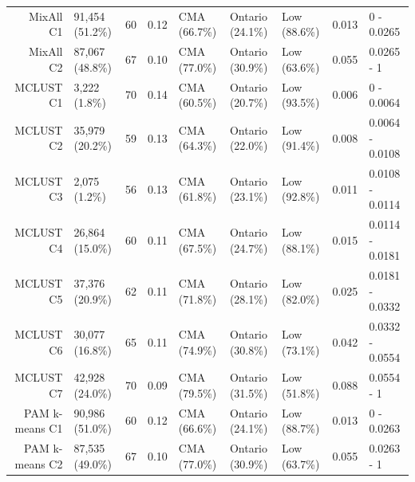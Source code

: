 \documentclass[11pt, a4paper]{article}
\begin{document}
\begin{table}[H]
{\begin{tabular}{|r|llllllll|}
  MixAll C1 & 91,454 (51.2\%) & 60 & 0.12 & CMA (66.7\%) & Ontario (24.1\%) & Low (88.6\%) & 0.013 & 0 - 0.0265 \\ 
  MixAll C2 & 87,067 (48.8\%) & 67 & 0.10 & CMA (77.0\%) & Ontario (30.9\%) & Low (63.6\%) & 0.055 & 0.0265 - 1 \\ 
 \rowcolor{gray!25} MCLUST C1 & 3,222 (1.8\%) & 70 & 0.14 & CMA (60.5\%) & Ontario (20.7\%) & Low (93.5\%) & 0.006 & 0 - 0.0064 \\ 
 \rowcolor{gray!25} MCLUST C2 & 35,979 (20.2\%) & 59 & 0.13 & CMA (64.3\%) & Ontario (22.0\%) & Low (91.4\%) & 0.008 & 0.0064 - 0.0108 \\ 
 \rowcolor{gray!25} MCLUST C3 & 2,075 (1.2\%) & 56 & 0.13 & CMA (61.8\%) & Ontario (23.1\%) & Low (92.8\%) & 0.011 & 0.0108 - 0.0114 \\ 
 \rowcolor{gray!25} MCLUST C4 & 26,864 (15.0\%) & 60 & 0.11 & CMA (67.5\%) & Ontario (24.7\%) & Low (88.1\%) & 0.015 & 0.0114 - 0.0181 \\ 
 \rowcolor{gray!25} MCLUST C5 & 37,376 (20.9\%) & 62 & 0.11 & CMA (71.8\%) & Ontario (28.1\%) & Low (82.0\%) & 0.025 & 0.0181 - 0.0332 \\ 
 \rowcolor{gray!25} MCLUST C6 & 30,077 (16.8\%) & 65 & 0.11 & CMA (74.9\%) & Ontario (30.8\%) & Low (73.1\%) & 0.042 & 0.0332 - 0.0554 \\ 
 \rowcolor{gray!25} MCLUST C7 & 42,928 (24.0\%) & 70 & 0.09 & CMA (79.5\%) & Ontario (31.5\%) & Low (51.8\%) & 0.088 & 0.0554 - 1 \\ 
  PAM k-means C1 & 90,986 (51.0\%) & 60 & 0.12 & CMA (66.6\%) & Ontario (24.1\%) & Low (88.7\%) & 0.013 & 0 - 0.0263 \\ 
  PAM k-means C2 & 87,535 (49.0\%) & 67 & 0.10 & CMA (77.0\%) & Ontario (30.9\%) & Low (63.7\%) & 0.055 & 0.0263 - 1 \\ 
   \hline
\end{tabular}
}
\end{table}
\end{document}
